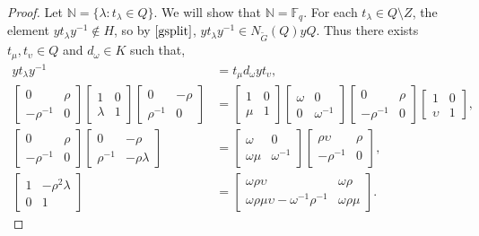 \documentclass[a4paper , 11pt]{book}
\theoremstyle{definition}
\theoremstyle{remark}
\begin{document}
\begin{proof}
Let $\mathbb{N} = \{ \lambda : t_\lambda \in Q \}$. We will show that $\mathbb{N} =\mathbb{F}_q$. For each $t_\lambda \in Q \setminus Z$, the element $y t_\lambda y^{-1} \notin H$, so by $\eqref{gsplit}$, $y t_\lambda y^{-1} \in N_{\widetilde{G}}(Q) y Q$. Thus there exists $t_\mu, t_\upsilon \in Q$ and $d_\omega \in K$ such that,
\begin{align*} y t_\lambda y^{-1} &= t_\mu d_\omega y t_\upsilon,
\\[1.5ex] \begin{bmatrix} 0 & \rho \\ -\rho^{-1} & 0 \end{bmatrix}\begin{bmatrix} 1 & 0 \\ \lambda & 1 \end{bmatrix}\begin{bmatrix} 0 & -\rho \\ \rho^{-1} & 0 \end{bmatrix} &= \begin{bmatrix} 1 & 0 \\ \mu & 1 \end{bmatrix}\begin{bmatrix} \omega & 0 \\ 0 & \omega^{-1} \end{bmatrix}\begin{bmatrix} 0 & \rho \\ -\rho^{-1} & 0 \end{bmatrix}\begin{bmatrix} 1 & 0 \\ \upsilon & 1 \end{bmatrix},
\\[1.5ex] \begin{bmatrix} 0 & \rho \\ -\rho^{-1} & 0 \end{bmatrix}\begin{bmatrix} 0 & -\rho \\ \rho^{-1} & -\rho \lambda \end{bmatrix} &= \begin{bmatrix} \omega & 0 \\ \omega \mu & \omega^{-1} \end{bmatrix}\begin{bmatrix} \rho \upsilon & \rho \\ -\rho^{-1} & 0 \end{bmatrix},
\\[1.5ex] \begin{bmatrix} 1 & -\rho^2 \lambda \\ 0 & 1 \end{bmatrix} &= \begin{bmatrix} \omega \rho \upsilon & \omega \rho \\ \omega \rho \mu \upsilon - \omega^{-1} \rho^{-1} & \omega \rho \mu \end{bmatrix}.
\end{align*}


\end{proof}
\end{document}
